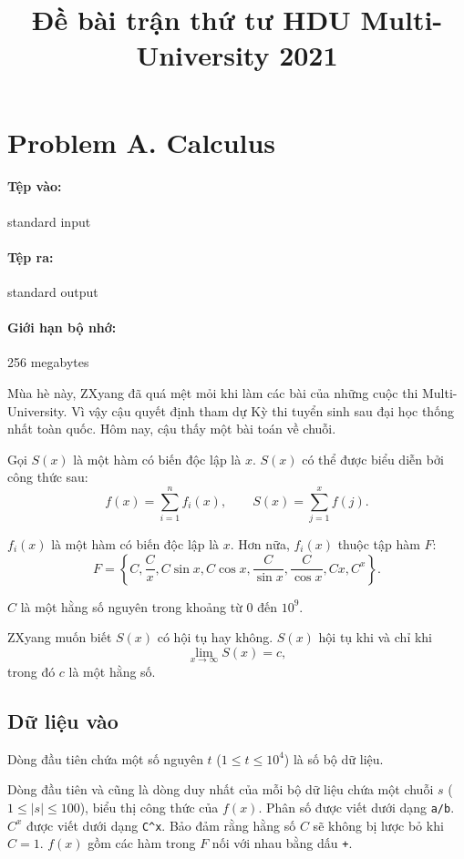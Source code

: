 \documentclass[11pt]{article}
\title{Đề bài trận thứ tư HDU Multi-University 2021}
\author{}
\date{}
\begin{document}
\maketitle


\section{Problem A. Calculus}

\paragraph{Tệp vào:} standard input
\paragraph{Tệp ra:} standard output
\paragraph{Giới hạn bộ nhớ:} 256 megabytes

Mùa hè này, ZXyang đã quá mệt mỏi khi làm các bài của những cuộc thi
Multi-University. Vì vậy cậu quyết định tham dự Kỳ thi tuyển sinh sau đại học
thống nhất toàn quốc. Hôm nay, cậu thấy một bài toán về chuỗi.

Gọi \(S(x)\) là một hàm có biến độc lập là \(x\). \(S(x)\) có thể được biểu
diễn bởi công thức sau:
\[
  f(x)=\sum_{i=1}^{n} f_i(x),
  \qquad
  S(x)=\sum_{j=1}^{x} f(j).
\]

\(f_i(x)\) là một hàm có biến độc lập là \(x\). Hơn nữa, \(f_i(x)\) thuộc tập
hàm \(F\):
\[
  F=\left\{
  C,\frac{C}{x},C\sin x,C\cos x,
  \frac{C}{\sin x},\frac{C}{\cos x},Cx,C^x
  \right\}.
\]

\(C\) là một hằng số nguyên trong khoảng từ \(0\) đến \(10^9\).

ZXyang muốn biết \(S(x)\) có hội tụ hay không. \(S(x)\) hội tụ khi và chỉ khi
\[
  \lim_{x\to\infty} S(x)=c,
\]
trong đó \(c\) là một hằng số.

\subsection*{Dữ liệu vào}

Dòng đầu tiên chứa một số nguyên \(t\) (\(1\le t\le 10^4\)) là số bộ dữ liệu.

Dòng đầu tiên và cũng là dòng duy nhất của mỗi bộ dữ liệu chứa một chuỗi
\(s\) (\(1\le |s|\le 100\)), biểu thị công thức của \(f(x)\). Phân số được
viết dưới dạng \texttt{a/b}. \(C^x\) được viết dưới dạng \verb|C^x|.
Bảo đảm rằng hằng số \(C\) sẽ không bị lược bỏ khi \(C=1\). \(f(x)\) gồm các
hàm trong \(F\) nối với nhau bằng dấu \texttt{+}.
\end{document}
